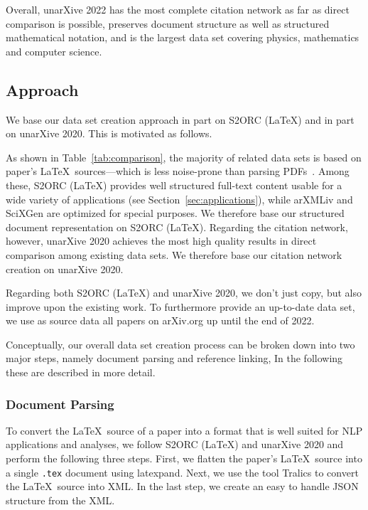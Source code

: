 Overall, unarXive 2022 has the most complete citation network as far as direct comparison is possible, preserves document structure as well as structured mathematical notation, and is the largest data set covering physics, mathematics and computer science.

\subsection{Approach}

We base our data set creation approach in part on S2ORC (\LaTeX) and in part on unarXive 2020. This is motivated as follows.

As shown in Table~\ref{tab:comparison}, the majority of related data sets is based on paper's \LaTeX\ sources---which is less noise-prone than parsing PDFs~\cite{Bast2017}. Among these, S2ORC (\LaTeX) provides well structured full-text content usable for a wide variety of applications (see Section~\ref{sec:applications}), while arXMLiv and SciXGen are optimized for special purposes. We therefore base our structured document representation on S2ORC (\LaTeX). Regarding the citation network, however, unarXive 2020 achieves the most high quality results in direct comparison among existing data sets. We therefore base our citation network creation on unarXive 2020.

Regarding both S2ORC (\LaTeX) and unarXive 2020, we don't just copy, but also improve upon the existing work. To furthermore provide an up-to-date data set, we use as source data all papers on arXiv.org up until the end of 2022.

Conceptually, our overall data set creation process can be broken down into two major steps, namely document parsing and reference linking, In the following these are described in more detail.

\subsubsection{Document Parsing}
To convert the \LaTeX\ source of a paper into a format that is well suited for NLP applications and analyses, we follow S2ORC (\LaTeX) and unarXive 2020 and perform the following three steps. First, we flatten the paper's \LaTeX\ source into a single \texttt{.tex} document using latexpand. Next, we use the tool Tralics to convert the \LaTeX\ source into XML. In the last step, we create an easy to handle JSON structure from the XML.

